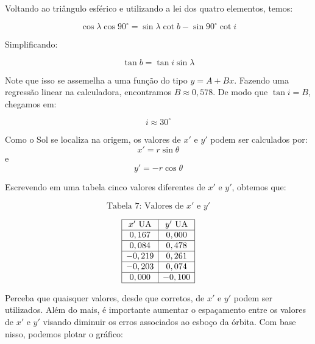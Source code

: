\documentclass[11pt]{article}
\begin{document}
\begin{pproblem}
\begin{pssolution*}{}{}
\begin{alternativas}
            Voltando ao triângulo esférico e utilizando a lei dos quatro elementos, temos:

            \[\cos\lambda\cos90^\circ = \sin\lambda\cot b -\sin90^\circ\cot i\]

            Simplificando:

            \[\tan b = \tan i \sin \lambda\]

            Note que isso se assemelha a uma função do tipo \(y= A + Bx\). Fazendo uma regressão linear na calculadora, encontramos \(B\approx 0,578\). De modo que \(\tan i = B\), chegamos em:

            \[\boxed{i \approx 30^\circ}\]

        \item Como o Sol se localiza na origem, os valores de \(x'\) e \(y'\) podem ser calculados por:
            \[
            x' = r \sin \theta
            \]
            e
            \[
            y' = -r \cos \theta
            \]

            Escrevendo em uma tabela cinco valores diferentes de \(x'\) e \(y'\), obtemos que:

            \[
            \text{Tabela 7: Valores de \(x'\) e \(y'\)}
            \]

            \[
            \begin{array}{|c|c|}
            \hline
            x'\text{ UA} & y'\text{ UA} \\ \hline
            0,167 & 0,000 \\ \hline
            0,084 & 0,478 \\ \hline
            -0,219 & 0,261 \\ \hline
            -0,203 & 0,074 \\ \hline
            0,000 & -0,100 \\ \hline
            \end{array}
            \]

            Perceba que quaisquer valores, desde que corretos, de \(x'\) e \(y'\) podem ser utilizados. Além do mais, é importante aumentar o espaçamento entre os valores de \(x'\) e \(y'\) visando diminuir os erros associados ao esboço da órbita. Com base nisso, podemos plotar o gráfico:


\end{alternativas}
\end{pssolution*}
\end{pproblem}
\end{document}
